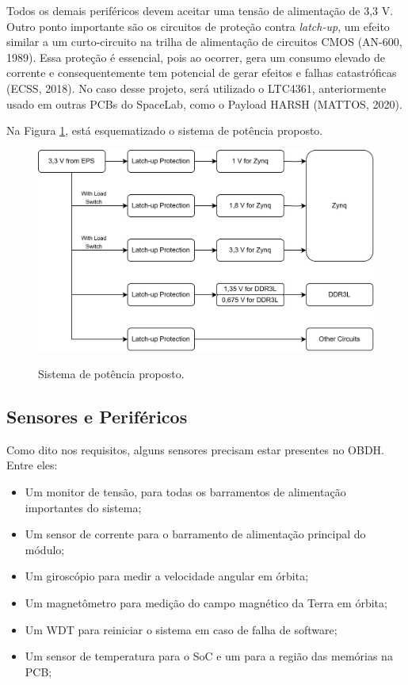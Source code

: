 Todos os demais periféricos devem aceitar uma tensão de alimentação de 3,3 V. Outro ponto importante são os circuitos de proteção contra \textit{latch-up}, um efeito similar a um curto-circuito na trilha de alimentação de circuitos CMOS (AN-600, 1989). Essa proteção é essencial, pois ao ocorrer, gera um consumo elevado de corrente e consequentemente tem potencial de gerar efeitos e falhas catastróficas (ECSS, 2018). No caso desse projeto, será utilizado o LTC4361, anteriormente usado em outras PCBs do SpaceLab, como o Payload HARSH (MATTOS, 2020). 

Na Figura \ref{fig:diapower}, está esquematizado o sistema de potência proposto.

\begin{figure}[H]
    \centering
    \caption{Sistema de potência proposto.}
    \includegraphics[scale=1]{images/diapower.png}
    \label{fig:diapower}
\end{figure}

\subsection{Sensores e Periféricos}
Como dito nos requisitos, alguns sensores precisam estar presentes no OBDH. Entre eles:

\begin{itemize}
	\item Um monitor de tensão, para todas os barramentos de alimentação importantes do sistema;
	\item Um sensor de corrente para o barramento de alimentação principal do módulo;
	\item Um giroscópio para medir a velocidade angular em órbita;
	\item Um magnetômetro para medição do campo magnético da Terra em órbita;
	\item Um WDT para reiniciar o sistema em caso de falha de software;
	\item Um sensor de temperatura para o SoC e um para a região das memórias na PCB;
\end{itemize}

